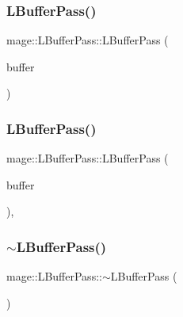 \hypertarget{structmage_1_1_l_buffer_pass_a0cd35fd1ded3c17d04c1689d1e30e476}{}\label{structmage_1_1_l_buffer_pass_a0cd35fd1ded3c17d04c1689d1e30e476} 
\subsubsection{\texorpdfstring{L\+Buffer\+Pass()}{LBufferPass()}\hspace{0.1cm}{\footnotesize\ttfamily [2/3]}}
{\footnotesize\ttfamily mage\+::\+L\+Buffer\+Pass\+::\+L\+Buffer\+Pass (\begin{DoxyParamCaption}\item[{const \hyperlink{structmage_1_1_l_buffer_pass}{L\+Buffer\+Pass} \&}]{buffer }\end{DoxyParamCaption})\hspace{0.3cm}{\ttfamily [delete]}}

\hypertarget{structmage_1_1_l_buffer_pass_ae68baaaa3fee2a76d64037f58d3e389b}{}\label{structmage_1_1_l_buffer_pass_ae68baaaa3fee2a76d64037f58d3e389b} 
\subsubsection{\texorpdfstring{L\+Buffer\+Pass()}{LBufferPass()}\hspace{0.1cm}{\footnotesize\ttfamily [3/3]}}
{\footnotesize\ttfamily mage\+::\+L\+Buffer\+Pass\+::\+L\+Buffer\+Pass (\begin{DoxyParamCaption}\item[{\hyperlink{structmage_1_1_l_buffer_pass}{L\+Buffer\+Pass} \&\&}]{buffer }\end{DoxyParamCaption})\hspace{0.3cm}{\ttfamily [default]}, {\ttfamily [noexcept]}}

\hypertarget{structmage_1_1_l_buffer_pass_ae9bad6fa2eb3827f9e28a3f21a974496}{}\label{structmage_1_1_l_buffer_pass_ae9bad6fa2eb3827f9e28a3f21a974496} 
\subsubsection{\texorpdfstring{$\sim$\+L\+Buffer\+Pass()}{~LBufferPass()}}
{\footnotesize\ttfamily mage\+::\+L\+Buffer\+Pass\+::$\sim$\+L\+Buffer\+Pass (\begin{DoxyParamCaption}{ }\end{DoxyParamCaption})\hspace{0.3cm}{\ttfamily [default]}}



